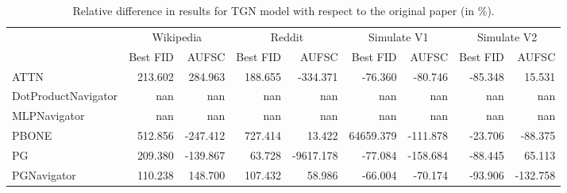 \begin{table}
\centering
\begin{tabular}{lrrrrrrrr}
\toprule
 & \multicolumn{2}{c}{Wikipedia} & \multicolumn{2}{c}{Reddit} & \multicolumn{2}{c}{Simulate V1} & \multicolumn{2}{c}{Simulate V2} \\
 & Best FID & AUFSC & Best FID & AUFSC & Best FID & AUFSC & Best FID & AUFSC \\
\midrule
ATTN & 213.602 & 284.963 & 188.655 & -334.371 & -76.360 & -80.746 & -85.348 & 15.531 \\
DotProductNavigator & nan & nan & nan & nan & nan & nan & nan & nan \\
MLPNavigator & nan & nan & nan & nan & nan & nan & nan & nan \\
PBONE & 512.856 & -247.412 & 727.414 & 13.422 & 64659.379 & -111.878 & -23.706 & -88.375 \\
PG & 209.380 & -139.867 & 63.728 & -9617.178 & -77.084 & -158.684 & -88.445 & 65.113 \\
PGNavigator & 110.238 & 148.700 & 107.432 & 58.986 & -66.004 & -70.174 & -93.906 & -132.758 \\
\bottomrule
\end{tabular}
\caption{\label{tab:tgn_results_diff}Relative difference in results for TGN model with respect to the original paper (in \%).}
\end{table}
